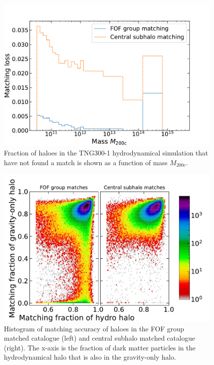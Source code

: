 \begin{figure}
    \includegraphics[width=\linewidth]{plots/hal_match_efficiency_mass.pdf}
    \caption{Fraction of haloes in the TNG300-1 hydrodynamical simulation that have not found a match is shown as a function of mass $M_{200c}$.}
    \label{fig:efficiency-mass-ch:simbase}
\end{figure}

\begin{figure}
\centering
\includegraphics[width=\linewidth]{plots/hal_match_accuracy_hist2d.pdf}
\caption{Histogram of matching accuracy of haloes in the FOF group matched catalogue (left) and central subhalo matched catalogue (right). The x-axis is the fraction of dark matter particles in the hydrodynamical halo that is also in the gravity-only halo.}
\label{fig:accuracy-hist2d-ch:simbase}
\end{figure}

